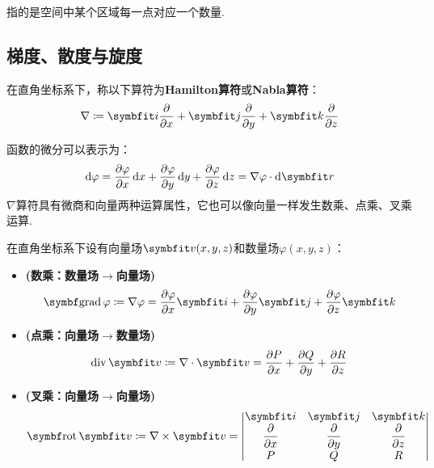 \begin{definition}
    指的是空间中某个区域每一点对应一个数量.
\end{definition}


\subsection{梯度、散度与旋度}
\begin{definition}
    在直角坐标系下，称以下算符为\textbf{Hamilton算符}或\textbf{Nabla算符}：
    \[\nabla \coloneq \vb{i}\pdv{x} + \vb{j}\pdv{y} + \vb{k}\pdv{z}\]
\end{definition}

函数的微分可以表示为：
\[\dd{\varphi} = \pdv{\varphi}{x}\dd{x} + \pdv{\varphi}{y}\dd{y} + \pdv{\varphi}{z}\dd{z} = \nabla\varphi \cdot \dd{\vb{r}}\]
$\nabla$算符具有微商和向量两种运算属性，它也可以像向量一样发生数乘、点乘、叉乘运算.

\begin{definition}
    在直角坐标系下设有向量场$\vb{v}(x,y,z)$和数量场$\varphi(x,y,z)$：
    \begin{itemize}
        \item {}\textbf{(数乘：数量场$\to$向量场)}
        \[\grad\varphi \coloneq \nabla\varphi = \pdv{\varphi}{x}\vb{i} + \pdv{\varphi}{y}\vb{j} + \pdv{\varphi}{z}\vb{k}\]
        \item {}\textbf{(点乘：向量场$\to$数量场)}
        \[\operatorname{div}\vb{v} \coloneq \nabla\cdot\vb{v} = \pdv{P}{x} + \pdv{Q}{y} + \pdv{R}{z}\]
        \item {}\textbf{(叉乘：向量场$\to$向量场)}
        \[\rot\vb{v} \coloneq \nabla\times\vb{v} = \begin{vmatrix}
            \vb{i} & \vb{j} & \vb{k} \\
            \displaystyle\pdv{x} & \displaystyle\pdv{y} & \displaystyle\pdv{z} \\
            P & Q & R
        \end{vmatrix}\]
    \end{itemize}
\end{definition}

